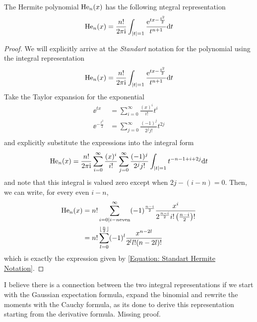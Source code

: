 \begin{prop}
	The Hermite polynomial $\mathrm{He}_{n}(x)$ has the following ntegral representation
	\begin{equation}
		\mathrm{He}_{n}(x) = \frac{n!}{2\pi\mathrm{i}} \int_{|t| = 1} \frac{\operatorname{e}^{tx - \frac{t^2}{2}}}{t^{n+1}} \mathrm{d} t
	\end{equation}
	\label{Prop: Hermite Integral Representation}
\end{prop}
\begin{proof}
	We will explicitly arrive at the \textit{Standart} notation for the polynomial using the integral representation
	\begin{equation}
		\mathrm{He}_{n}(x) = \frac{n!}{2\pi\mathrm{i}} \int_{|t| = 1} \frac{\operatorname{e}^{tx - \frac{t^2}{2}}}{t^{n+1}} \mathrm{d} t
	\end{equation}
	Take the Taylor expansion for the exponential
	\begin{align}
		\ee^{tx} & = \sum_{i=0}^{\infty} \frac{(x)^i}{i!} t^i \\
		\ee^{-\frac{t^2}{2}} & = \sum_{j=0}^{\infty} \frac{(-1)^j}{2^j j!} t^{2j}\\
	\end{align}
	and explicitly substitute the expressions into the integral form
	\begin{equation}
		\mathrm{He}_{n}(x) = \frac{n!}{2\pi\mathrm{i}} \sum_{i=0}^{\infty} \frac{(x)^i}{i!} \sum_{j=0}^{\infty} \frac{(-1)^j}{2^j j!} \int_{|t| = 1} t^{-n-1+i+2j} \mathrm{d} t
	\end{equation}
	and note that this integral is valued zero except when $2j - (i-n) = 0$. Then, we can write, for every even $i-n$,
	\begin{align}
		\mathrm{He}_n(x) & = n! \sum_{i=0|i-n\text{even}}^{\infty} (-1)^{\frac{n-i}{2}} \frac{x^i}{2^{\frac{n-i}{2}} i! \left( \frac{n-i}{2} \right)!} \\
		& = n! \sum_{l=0}^{\lfloor \frac{n}{2} \rfloor} (-1)^{l} \frac{x^{n-2l}}{2^l l! (n-2l)!}
	\end{align}
	which is exactly the expression given by \ref{Equation: Standart Hermite Notation}.
\end{proof}

\begin{prop}
	I believe there is a connection between the two integral representations if we start with the Gaussian expectation formula, expand the binomial and rewrite the moments with the Cauchy formula, as its done to derive this representation starting from the derivative formula. Missing proof. 
\end{prop}